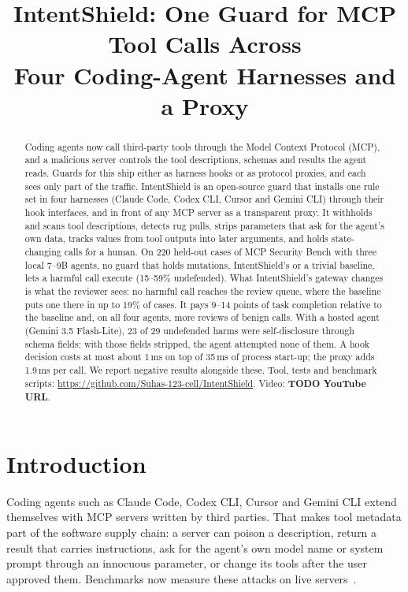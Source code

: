 \documentclass[10pt,conference]{IEEEtran}
\newcommand{\tool}{IntentShield\xspace}
\newcommand{\repo}{\url{https://github.com/Suhas-123-cell/IntentShield}}
\begin{document}
\title{IntentShield: One Guard for MCP Tool Calls Across\\Four Coding-Agent Harnesses and a Proxy}

\author{
}

\maketitle

\begin{abstract}
Coding agents now call third-party tools through the Model Context Protocol (MCP), and a malicious
server controls the tool descriptions, schemas and results the agent reads. Guards for this ship
either as harness hooks or as protocol proxies, and each sees only part of the traffic. \tool is an
open-source guard that installs one rule set in four harnesses (Claude Code, Codex CLI, Cursor and
Gemini CLI) through their hook interfaces, and in front of any MCP server as a transparent proxy. It
withholds and scans tool descriptions, detects rug pulls, strips parameters that ask for the
agent's own data, tracks values from tool outputs into later arguments, and holds state-changing
calls for a human. On 220 held-out cases of MCP Security Bench with three local 7--9B agents, no guard
that holds mutations, \tool's or a trivial baseline, lets a harmful call execute (15--59\%
undefended). What \tool's gateway changes is what the reviewer sees: no harmful call reaches the review queue, where the
baseline puts one there in up to 19\% of cases. It pays 9--14 points of task completion relative to
the baseline and, on all four agents, more reviews of benign calls. With a hosted agent (Gemini 3.5
Flash-Lite), 23 of 29 undefended harms were self-disclosure through schema fields; with those fields
stripped, the agent attempted none of them. A hook decision costs at most about 1\,ms on top of 35\,ms of process
start-up; the proxy adds 1.9\,ms per call. We report negative results alongside these.
Tool, tests and benchmark scripts: \repo. Video: \textbf{TODO YouTube URL}.
\end{abstract}

\section{Introduction}
Coding agents such as Claude Code, Codex CLI, Cursor and Gemini CLI extend themselves with MCP servers
written by third parties. That makes tool metadata part of the software supply chain: a server can
poison a description, return a result that carries instructions, ask for the agent's own model name
or system prompt through an innocuous parameter, or change its tools after the user approved
them. Benchmarks now measure these attacks on live servers~\cite{msb,mcptox,mcpsafetybench}.
\end{document}
